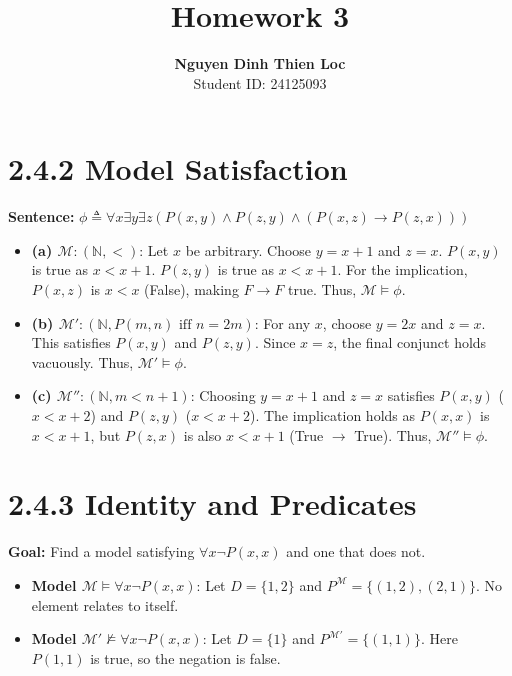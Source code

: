 \documentclass[12pt]{article}
\title{\color{tealblue} Homework 3}
\author{\textbf{Nguyen Dinh Thien Loc} \\ Student ID: 24125093}
\begin{document}
\maketitle

\section*{{\color{tealblue} 2.4.2} Model Satisfaction}
\textbf{Sentence:} $\phi \triangleq \forall x \exists y \exists z (P(x,y) \wedge P(z,y) \wedge (P(x,z) \rightarrow P(z,x)))$

\begin{tcolorbox}[title=Evaluation of Natural Number Models]
\begin{itemize}
    \item \textbf{(a) $\mathcal{M}: (\mathbb{N}, <)$}: 
    Let $x$ be arbitrary. Choose $y = x+1$ and $z = x$. 
    $P(x,y)$ is true as $x < x+1$. $P(z,y)$ is true as $x < x+1$. 
    For the implication, $P(x,z)$ is $x < x$ (False), making $F \rightarrow F$ true. 
    Thus, $\mathcal{M} \models \phi$.

    \item \textbf{(b) $\mathcal{M}': (\mathbb{N}, P(m,n) \text{ iff } n=2m)$}: 
    For any $x$, choose $y = 2x$ and $z = x$. 
    This satisfies $P(x,y)$ and $P(z,y)$. Since $x=z$, the final conjunct holds vacuously. 
    Thus, $\mathcal{M}' \models \phi$.

    \item \textbf{(c) $\mathcal{M}'': (\mathbb{N}, m < n+1)$}: 
    Choosing $y = x+1$ and $z = x$ satisfies $P(x,y)$ ($x < x+2$) and $P(z,y)$ ($x < x+2$). 
    The implication holds as $P(x,x)$ is $x < x+1$, but $P(z,x)$ is also $x < x+1$ (True $\rightarrow$ True).
    Thus, $\mathcal{M}'' \models \phi$.
\end{itemize}
\end{tcolorbox}

\section*{{\color{tealblue} 2.4.3} Identity and Predicates}
\textbf{Goal:} Find a model satisfying $\forall x \neg P(x,x)$ and one that does not.

\begin{itemize}
    \item \textbf{Model $\mathcal{M} \models \forall x \neg P(x,x)$}: Let $D=\{1,2\}$ and $P^{\mathcal{M}}=\{(1,2),(2,1)\}$. No element relates to itself.
    \item \textbf{Model $\mathcal{M}' \not\models \forall x \neg P(x,x)$}: Let $D=\{1\}$ and $P^{\mathcal{M}'}=\{(1,1)\}$. Here $P(1,1)$ is true, so the negation is false.
\end{itemize}
\end{document}
